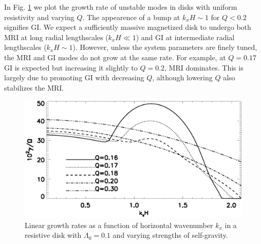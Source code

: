In Fig. \ref{compare_growth_varQ} we plot the growth rate of 
unstable modes in disks with uniform resistivity and varying $Q$.  
The appearence of a bump at $k_xH\sim1$ for $Q< 0.2$ signifies GI. 
We expect a sufficiently massive magnetized disk to undergo both MRI
at long radial lengthscales ($k_xH\ll 1$) and GI at intermediate
radial lengthscales ($k_xH\sim 1$). However, unless the system
parameters are finely tuned, the MRI and GI modes do not grow
at the same rate. For example, at $Q=0.17$ GI is expected but
increasing it slightly to $Q=0.2$, MRI dominates. This is largely due
to promoting GI with decreasing $Q$, although lowering $Q$ also
stabilizes the MRI. 

\begin{figure}
  \includegraphics[width=\linewidth]{figures/compare_growth_varQ}
  \caption{Linear growth rates as a function of horizontal wavenumber
    $k_x$ in a resistive disk with $\Lambda_0=0.1$ and varying
    strengths of self-gravity. 
    \label{compare_growth_varQ}}
\end{figure}






